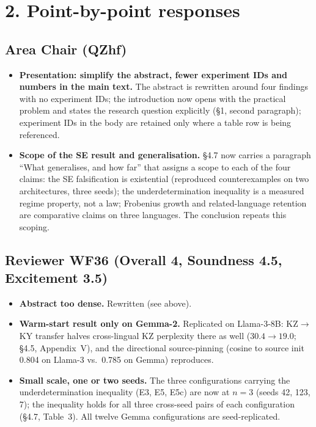 \documentclass[11pt]{article}
\begin{document}
\section*{2. Point-by-point responses}

\subsection*{Area Chair (QZhf)}
\begin{itemize}
\item \textbf{Presentation: simplify the abstract, fewer experiment IDs and
numbers in the main text.} The abstract is rewritten around four findings
with no experiment IDs; the introduction now opens with the practical
problem and states the research question explicitly (\S1, second
paragraph); experiment IDs in the body are retained only where a table row
is being referenced.
\item \textbf{Scope of the SE result and generalisation.} \S4.7 now carries a
paragraph ``What generalises, and how far'' that assigns a scope to each of
the four claims: the SE falsification is existential (reproduced
counterexamples on two architectures, three seeds); the underdetermination
inequality is a measured regime property, not a law; Frobenius growth and
related-language retention are comparative claims on three languages. The
conclusion repeats this scoping.
\end{itemize}

\subsection*{Reviewer WF36 (Overall 4, Soundness 4.5, Excitement 3.5)}
\begin{itemize}
\item \textbf{Abstract too dense.} Rewritten (see above).
\item \textbf{Warm-start result only on Gemma-2.} Replicated on Llama-3-8B:
KZ$\to$KY transfer halves cross-lingual KZ perplexity there as well
($30.4\to19.0$; \S4.5, Appendix~V), and the directional source-pinning
(cosine to source init 0.804 on Llama-3 vs.\ 0.785 on Gemma) reproduces.
\item \textbf{Small scale, one or two seeds.} The three configurations carrying
the underdetermination inequality (E3, E5, E5c) are now at $n{=}3$ (seeds
42, 123, 7); the inequality holds for all three cross-seed pairs of each
configuration (\S4.7, Table~3). All twelve Gemma configurations are
seed-replicated.
\end{itemize}
\end{document}

